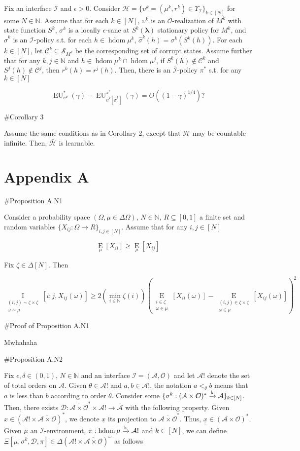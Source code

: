 \documentclass[a4paper]{article}
\newcommand{\E}[1]{\underset{#1}{\operatorname{E}}}
\newcommand{\EE}[2]{\underset{\substack{#1 \\ #2}}{\operatorname{E}}}
\newcommand{\II}[2]{\underset{\substack{#1 \\ #2}}{\operatorname{I}}}
\newcommand{\Nats}{\mathbb{N}}
\newcommand{\Estr}{\boldsymbol{\lambda}}
\newcommand{\M}{\xrightarrow{\textnormal{k}}}
\newcommand{\Ob}{\mathcal{O}}
\newcommand{\A}{\mathcal{A}}
\newcommand{\St}{\mathcal{S}}
\newcommand{\In}{\mathcal{I}}
\newcommand{\FH}{(\A \times \Ob)^*}
\newcommand{\Ada}{\bar{\A}}
\newcommand{\Adao}{\overline{\A \times \Ob}}
\newcommand{\Adfh}{\Adao^*}
\DeclareMathOperator{\HD}{hdom}
\newcommand{\Hy}{\mathcal{H}}
\newcommand{\Co}{\mathcal{C}}
\newcommand{\EU}{\operatorname{EU}}
\newcommand{\D}{\mathcal{D}}
\begin{document}
Fix an interface $\In$ and $\epsilon > 0$. Consider $\Hy = \{\upsilon^k = (\mu^k,r^k) \in \Upsilon_{\In}\}_{k \in [N]}$ for some $N \in \Nats$. Assume that for each $k \in [N]$, $\upsilon^k$ is an $\Ob$-realization of $M^k$ with state function $S^k$, $\sigma^k$ is a locally $\epsilon$-sane at $S^k(\Estr)$ stationary policy for $M^k$, and $\hat{\sigma}^k$ is an $\In$-policy s.t. for each $h \in \HD{\mu^k}$, $\hat{\sigma}^k(h)=\sigma^k\left(S^k(h)\right)$. For each $k \in [N]$, let $\Co^k \subseteq \St_{M^k}$ be the corresponding set of corrupt states. Assume further that for any $k,j \in \Nats$ and $h \in \HD{\mu^k} \cap \HD{\mu^j}$, if $S^k(h) \not\in \Co^k$ and $S^j(h) \not\in \Co^j$, then $r^k(h)=r^j(h)$. Then, there is an $\bar{\In}$-policy $\pi^*$ s.t. for any $k \in [N]$

$$\EU_{\upsilon^k}^*(\gamma) - \EU_{\bar{\upsilon}^k\left[\hat{\sigma}^k\right]}^{\pi^*}(\gamma) = O\left((1-\gamma)^{1/4}\right)?$$

\#Corollary 3

Assume the same conditions as in Corollary 2, except that $\Hy$ may be countable infinite. Then, $\bar{\Hy}$ is learnable.

\section{Appendix A}

\#Proposition A.N1

Consider a probability space $(\Omega, \mu \in \Delta\Omega)$, $N \in \Nats$, $R \subseteq [0,1]$ a finite set and random variables $\{X_{ij}: \Omega \rightarrow R\}_{i,j \in [N]}$. Assume that for any $i,j \in [N]$ 

$$\E{\mu}\left[X_{ii}\right] \geq \E{\mu}\left[X_{ij}\right]$$ 

Fix $\zeta \in \Delta[N]$. Then

$$\II{(i,j)\sim\zeta\times\zeta}{\omega\sim\mu}\left[i;j,X_{ij}(\omega)\right] \geq 2 \left(\min_{i \in \Nats} {\zeta(i)}\right) \left(\EE{i \in \zeta}{\omega \in \mu}\left[X_{ii}(\omega)\right]-\EE{(i,j) \in \zeta \times \zeta}{\omega \in \mu}\left[X_{ij}(\omega)\right]\right)^2$$

\#Proof of Proposition A.N1

Mwhahaha

\#Proposition A.N2

Fix $\epsilon,\delta \in (0,1)$, $N \in \Nats$ and an interface $\In=(\A,\Ob)$ and let $\A!$ denote the set of total orders on $\A$. Given $\theta \in \A!$ and $a,b \in \A!$, the notation $a <_\theta b$ means that $a$ is less than $b$ according to order $\theta$. Consider some $\{\sigma^k: \FH \M \A\}_{k \in [N]}$. Then, there exists $\D: \Adfh \times \A! \rightarrow \Ada$ with the following property. Given $x \in \left(\A! \times \Adao\right)^*$, we denote $\underline{x}$ its projection to $\Adfh$. Thus, $\underline{\underline{x}}\in\FH$.
Given  $\mu$ an $\In$-environment, $\pi: \HD{\mu} \M \A!$ and $k \in [N]$, we can define $\Xi\left[\mu,\sigma^k,\D,\pi\right]\in \Delta\left(\A! \times \Adao\right)^\omega$ as follows
 
\end{document}
